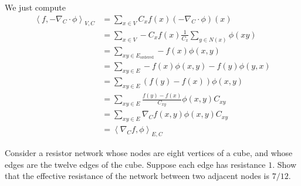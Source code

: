 \documentclass[12 pt, letterpaper]{hmcpset}
\begin{document}
\begin{solution}
	We just compute
	\begin{align*}
		\left < f, - \nabla_{C} \cdot \phi \right >_{V, C} & = \sum_{x \in V} C_{x} f(x) (-\nabla_{C} \cdot \phi)(x) \\
								   & = \sum_{x \in V} - C_{x} f(x) \frac{1}{C_{x}} \sum_{y \in N(x)} \phi(xy) \\
								   & = \sum_{xy \in E_{\text{ordered}}} - f(x) \phi(x, y) \\
								   & = \sum_{xy \in E} -f(x) \phi(x, y) - f(y) \phi(y, x) \\
								   & = \sum_{xy \in E} (f(y) - f(x)) \phi(x, y) \\
								   & = \sum_{xy \in E} \frac{f(y) - f(x)}{C_{xy}} \phi(x, y) C_{xy} \\
								   & = \sum_{xy \in E} \nabla_{C} f(x, y) \phi(x, y) C_{xy} \\
								   & = \left < \nabla_{C} f, \phi \right >_{E, C}
	\end{align*}
\end{solution}

\pagebreak

\begin{problem}[44.]
	Consider a resistor network whose nodes are eight vertices of a cube, and whose edges are the twelve edges of the cube. Suppose each edge has resistance $1$. Show that the effective resistance of the network between two adjacent nodes is $7 / 12$.
\end{problem}
\end{document}
